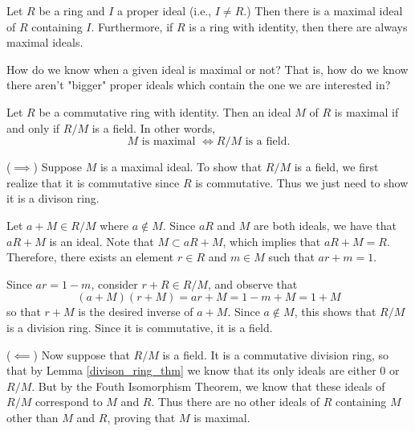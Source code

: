    \begin{thm}
        Let $R$ be a ring and $I$ a proper ideal (i.e., $I \ne
        R$.) Then there is a maximal ideal of $R$ containing $I$.
        Furthermore, if $R$ is a ring with identity, then there
        are always maximal ideals.
    \end{thm}

    How do we know when a given ideal is maximal or not? That is,
    how do we know there aren't "bigger" proper ideals which
    contain the one we are interested in?
    \begin{thm} \label{maximal_theorem}
        Let $R$ be a commutative ring with identity. Then an ideal
        $M$ of $R$ is maximal if and only if $R/M$ is a field. In
        other words, 
        \[
            M \text{ is maximal } \iff R/M \text{ is a field.}
        \]
        \vspace{-0.8cm}

    \end{thm}

    \begin{prf}
        ($\implies$) Suppose $M$ is a maximal ideal. To show that $R/M$ is a
        field, we first realize that it is commutative since $R$
        is commutative. Thus we just need to show it is a divison
        ring. 

        Let $a + M \in R/M$ where $a \not\in M$. Since $aR$ and
        $M$ are both ideals, we have that $aR + M$ is an ideal.
        Note that $M \subset aR + M$, which implies that $aR +  M
        = R$. Therefore, there exists an element $r \in R$ and $m
        \in M$ such
        that $ar + m = 1$. 

        Since $ar = 1 - m$, consider $r + R \in R/M$, and observe
        that 
        \[
            (a + M)(r + M) = ar + M = 1 - m + M = 1 + M
        \]
        so that $r + M$ is the desired inverse of $a + M$. Since
        $a \not\in M$, this shows that $R/M$ is a division ring.
        Since it is commutative, it is a field. 

        ($\impliedby$)
        Now suppose that $R/M$ is a field. It is a commutative
        division ring, so that by Lemma \ref{divison_ring_thm} we
        know that its only ideals are either $0$ or $R/M$. But by
        the Fouth Isomorphism Theorem, we know that these ideals of
        $R/M$ correspond to $M$ and $R$. Thus there are no other
        ideals of $R$ containing $M$ other than $M$ and $R$,
        proving that $M$ is maximal. 
    \end{prf}

